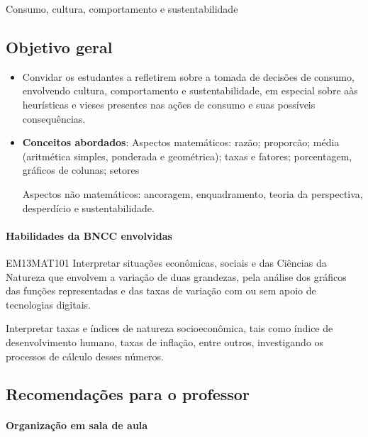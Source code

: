\begin{paginatexto}{Consumo, cultura, comportamento e sustentabilidade}
\raggedcolumns
\subsection*{Objetivo geral}

\begin{itemize}
\item Convidar os estudantes a refletirem sobre a tomada de decisões de consumo, envolvendo cultura, comportamento e sustentabilidade, em especial sobre aàs heurísticas e vieses presentes nas ações de consumo e suas possíveis consequências.

\item \textbf{Conceitos abordados}: 
Aspectos matemáticos: razão; proporcão; média (aritmética simples, ponderada e geométrica); taxas e fatores; porcentagem, gráficos de colunas; setores

Aspectos não matemáticos: ancoragem, enquadramento, teoria da perspectiva, desperdício e sustentabilidade.
\end{itemize}

\paragraph{Habilidades da BNCC envolvidas}

\begin{habilities}{EM13MAT101}
 Interpretar situações econômicas, sociais e das Ciências da Natureza
que envolvem a variação de duas grandezas, pela análise dos gráficos das funções representadas e das taxas de variação com ou sem apoio de tecnologias digitais.


Interpretar taxas e índices de natureza socioeconômica, tais como índice de desenvolvimento humano, taxas de inflação, entre outros, investigando os processos de cálculo desses números.
\end{habilities}

\subsection*{Recomendações para o professor}

\paragraph{Organização em sala de aula}


\end{paginatexto}
